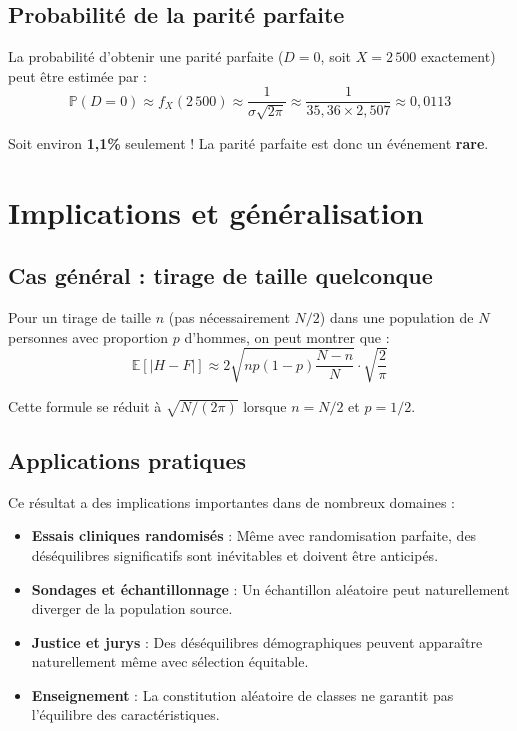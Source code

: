 \documentclass[11pt,a4paper]{article}
\theoremstyle{definition}
\theoremstyle{remark}
\begin{document}
\subsection{Probabilité de la parité parfaite}

La probabilité d'obtenir une parité parfaite ($D = 0$, soit $X = 2\,500$ exactement) peut être estimée par :
\[
\mathbb{P}(D = 0) \approx f_X(2\,500) \approx \frac{1}{\sigma\sqrt{2\pi}} \approx \frac{1}{35{,}36 \times 2{,}507} \approx 0{,}0113
\]

Soit environ \textbf{1,1\%} seulement ! La parité parfaite est donc un événement \textbf{rare}.

\section{Implications et généralisation}

\subsection{Cas général : tirage de taille quelconque}

Pour un tirage de taille $n$ (pas nécessairement $N/2$) dans une population de $N$ personnes avec proportion $p$ d'hommes, on peut montrer que :
\begin{equation}
\mathbb{E}[|H - F|] \approx 2\sqrt{np(1-p)\frac{N-n}{N}} \cdot \sqrt{\frac{2}{\pi}}
\end{equation}

Cette formule se réduit à $\sqrt{N/(2\pi)}$ lorsque $n = N/2$ et $p = 1/2$.

\subsection{Applications pratiques}

Ce résultat a des implications importantes dans de nombreux domaines :

\begin{itemize}
    \item \textbf{Essais cliniques randomisés} : Même avec randomisation parfaite, des déséquilibres significatifs sont inévitables et doivent être anticipés.
    
    \item \textbf{Sondages et échantillonnage} : Un échantillon aléatoire peut naturellement diverger de la population source.
    
    \item \textbf{Justice et jurys} : Des déséquilibres démographiques peuvent apparaître naturellement même avec sélection équitable.
    
    \item \textbf{Enseignement} : La constitution aléatoire de classes ne garantit pas l'équilibre des caractéristiques.
\end{itemize}
\end{document}

